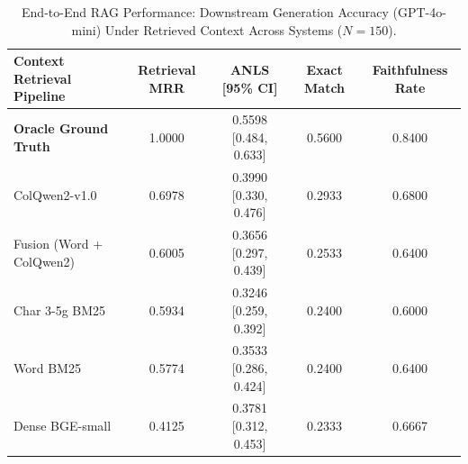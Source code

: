 \begin{table}[htbp]
\centering
\caption{End-to-End RAG Performance: Downstream Generation Accuracy (GPT-4o-mini) Under Retrieved Context Across Systems ($N=150$).}
\label{tab:e2e_rag_accuracy}
\small
\begin{tabular}{lcccc}
\toprule
\textbf{Context Retrieval Pipeline} & \textbf{Retrieval MRR} & \textbf{ANLS [95\% CI]} & \textbf{Exact Match} & \textbf{Faithfulness Rate} \\
\midrule
\textbf{Oracle Ground Truth} & 1.0000 & 0.5598 [0.484, 0.633] & 0.5600 & 0.8400 \\
ColQwen2-v1.0 & 0.6978 & 0.3990 [0.330, 0.476] & 0.2933 & 0.6800 \\
Fusion (Word + ColQwen2) & 0.6005 & 0.3656 [0.297, 0.439] & 0.2533 & 0.6400 \\
Char 3-5g BM25 & 0.5934 & 0.3246 [0.259, 0.392] & 0.2400 & 0.6000 \\
Word BM25 & 0.5774 & 0.3533 [0.286, 0.424] & 0.2400 & 0.6400 \\
Dense BGE-small & 0.4125 & 0.3781 [0.312, 0.453] & 0.2333 & 0.6667 \\
\bottomrule
\end{tabular}
\end{table}
